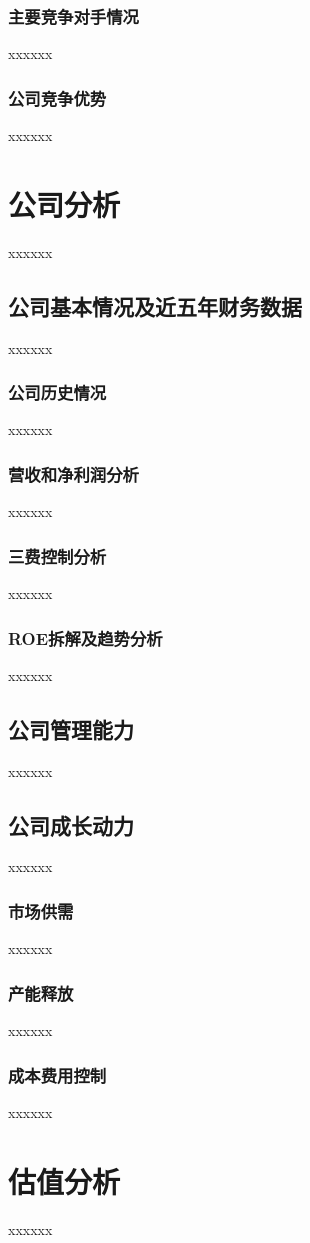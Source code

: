 \documentclass[a4paper,12pt,lang=cn,fontset = windows]{elegantpaper} %
\begin{document}
\subsubsection{主要竞争对手情况}
xxxxxx
\subsubsection{公司竞争优势}
xxxxxx
\section{公司分析}
xxxxxx
\subsection{公司基本情况及近五年财务数据} 
xxxxxx
\subsubsection{公司历史情况}
xxxxxx
\subsubsection{营收和净利润分析}
xxxxxx
\subsubsection{三费控制分析}
xxxxxx
\subsubsection{ROE拆解及趋势分析}
xxxxxx
\subsection{公司管理能力}
xxxxxx
\subsection{公司成长动力} 
xxxxxx 
\subsubsection{市场供需}
xxxxxx
\subsubsection{产能释放}
xxxxxx
\subsubsection{成本费用控制}
xxxxxx
\section{估值分析}
xxxxxx
\end{document}
